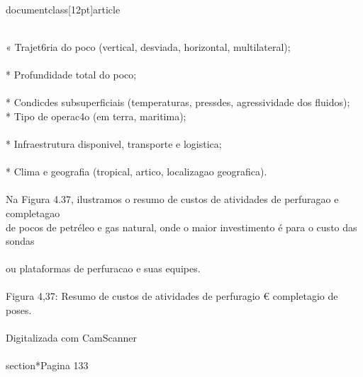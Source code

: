 \\documentclass[12pt]{article}
\begin{document}
\\
« Trajet6ria do poco (vertical, desviada, horizontal, multilateral);\\
\\
* Profundidade total do poco;\\
\\
* Condicdes subsuperficiais (temperaturas, pressdes, agressividade dos fluidos);\\
* Tipo de operac4o (em terra, maritima);\\
\\
* Infraestrutura disponivel, transporte e logistica;\\
\\
* Clima e geografia (tropical, artico, localizagao geografica).\\
\\
Na Figura 4.37, ilustramos o resumo de custos de atividades de perfuragao e completagao\\
de pocos de petréleo e gas natural, onde o maior investimento é para o custo das sondas\\
\\
ou plataformas de perfuracao e suas equipes.\\
\\
Figura 4,37: Resumo de custos de atividades de perfuragio € completagio de poses.\\
\\
Digitalizada com CamScanner\\

\\section*{Pagina 133}
\end{document}
